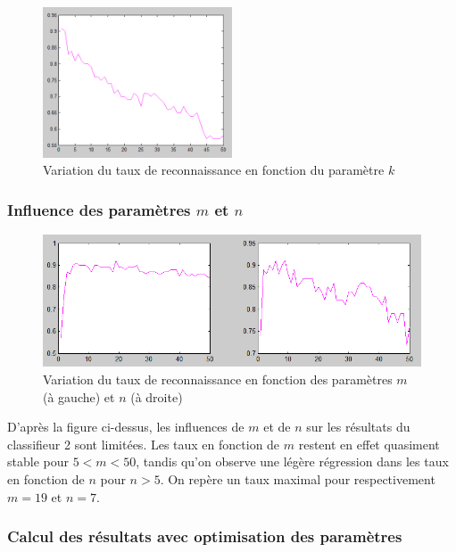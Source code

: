 \newpage
\begin{figure}[h]
	\begin{center}
		\includegraphics[width=0.5\textwidth]{img/31-influence-k.png}
	\end{center}
	\caption{Variation du taux de reconnaissance en fonction du paramètre $k$}
	\label{fig:rate2}
\end{figure}

\subsubsection{Influence des paramètres $m$ et $n$}

\begin{figure}[h]
	\begin{center}
		\includegraphics[width=\textwidth]{img/32-influence-m-n.png}
	\end{center}
	\caption{Variation du taux de reconnaissance en fonction des paramètres $m$ (à gauche) et $n$ (à droite)}
	\label{fig:rate1}
\end{figure}

D'après la figure ci-dessus, les influences de $m$ et de $n$ sur les résultats du classifieur 2 sont limitées. Les taux en fonction de $m$ restent en effet quasiment stable pour $5<m<50$, tandis qu'on observe une légère régression dans les taux en fonction de $n$ pour $n>5$.
On repère un taux maximal pour respectivement $m=19$ et $n=7$.

\subsubsection{Calcul des résultats avec optimisation des paramètres}

